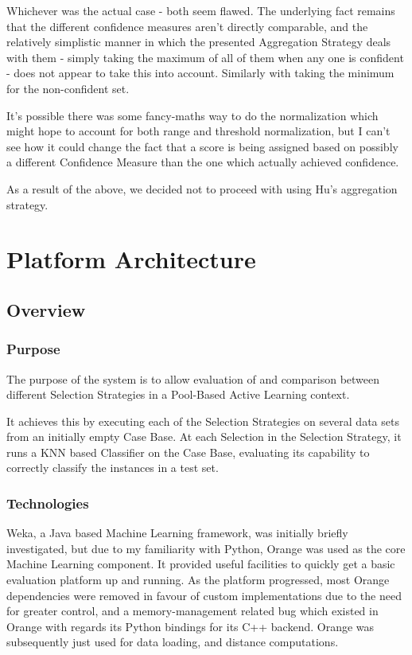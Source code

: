 \documentclass[a4paper,11pt]{report}
\begin{document}
Whichever was the actual case - both seem flawed. The underlying fact remains that the different confidence measures aren't directly comparable, and the relatively simplistic manner in which the presented Aggregation Strategy deals with them - simply taking the maximum of all of them when any one is confident - does not appear to take this into account. Similarly with taking the minimum for the non-confident set.

It's possible there was some fancy-maths way to do the normalization which might hope to account for both range and threshold normalization, but I can't see how it could change the fact that a score is being assigned based on possibly a different Confidence Measure than the one which actually achieved confidence.

As a result of the above, we decided not to proceed with using Hu's aggregation strategy.

\chapter{Platform Architecture\label{cha:platarch}}
\section{Overview}
\subsection{Purpose}
The purpose of the system is to allow evaluation of and comparison between different Selection Strategies in a Pool-Based Active Learning context.

It achieves this by executing each of the Selection Strategies on several data sets from an initially empty Case Base. At each Selection in the Selection Strategy, it runs a KNN based Classifier on the Case Base, evaluating its capability to correctly classify the instances in a test set.

\subsection{Technologies}
Weka\citep{prog:weka}, a Java based Machine Learning framework, was initially briefly investigated, but due to my familiarity with Python, Orange\citep{prog:orange} was used as the core Machine Learning component. It provided useful facilities to quickly get a basic evaluation platform up and running. As the platform progressed, most Orange dependencies were removed in favour of custom implementations due to the need for greater control, and a memory-management related bug which existed in Orange with regards its Python bindings for its C++ backend. Orange was subsequently just used for data loading, and distance computations.
\end{document}
